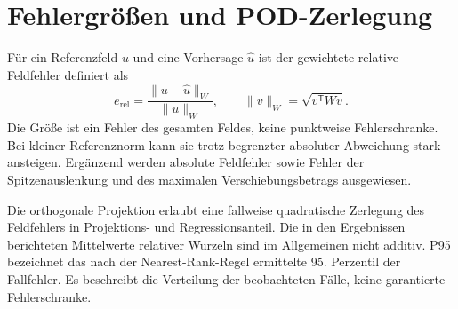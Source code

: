 \section{Fehlergrößen und POD-Zerlegung}
Für ein Referenzfeld $u$ und eine Vorhersage $\widehat u$ ist der gewichtete relative Feldfehler definiert als
\begin{equation}
 e_{\mathrm{rel}}=\frac{\lVert u-\widehat u\rVert_W}{\lVert u\rVert_W},
 \qquad \lVert v\rVert_W=\sqrt{v^{\mathsf T}Wv}.
 \label{eq:error}
\end{equation}
Die Größe ist ein Fehler des gesamten Feldes, keine punktweise Fehlerschranke. Bei kleiner Referenznorm kann sie trotz begrenzter absoluter Abweichung stark ansteigen. Ergänzend werden absolute Feldfehler sowie Fehler der Spitzenauslenkung und des maximalen Verschiebungsbetrags ausgewiesen.

Die orthogonale Projektion erlaubt eine fallweise quadratische Zerlegung des Feldfehlers in Projektions- und Regressionsanteil. Die in den Ergebnissen berichteten Mittelwerte relativer Wurzeln sind im Allgemeinen nicht additiv. P95 bezeichnet das nach der Nearest-Rank-Regel ermittelte 95. Perzentil der Fallfehler. Es beschreibt die Verteilung der beobachteten Fälle, keine garantierte Fehlerschranke.
